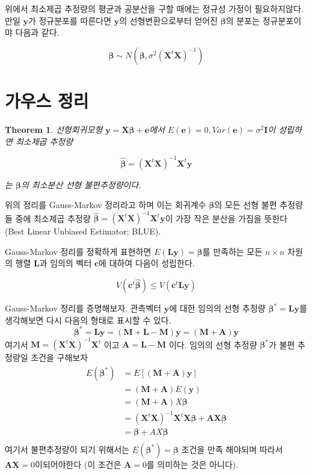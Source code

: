 \documentclass[
]{book}
\newtheorem{theorem}{Theorem}[chapter]
\theoremstyle{definition}
\theoremstyle{definition}
\theoremstyle{definition}
\theoremstyle{remark}
\begin{document}
위에서 최소제곱 추정량의 평균과 공분산을 구할 때에는 정규성 가정이 필요하지않다. 만일 \(\bm y\)가 정규분포를 따른다면 \(\bm y\)의 선형변환으로부터 얻어진 \(\bm \beta\)의 분포는 정규분포이먀 다음과 같다.

\[  \bm \beta \sim N \left (\bm \beta, \sigma^2( \bm X^t \bm X)^{-1} \right ) \]

\hypertarget{uxac00uxc6b0uxc2a4-uxc815uxb9ac}{%
\section{가우스 정리}\label{uxac00uxc6b0uxc2a4-uxc815uxb9ac}}

\begin{theorem}
\protect\hypertarget{thm:unnamed-chunk-13}{}{\label{thm:unnamed-chunk-13} }선형회귀모형 \(\bm y = \bm X \bm \beta + \bm e\)에서 \(E( \bm e)=0, Var( \bm e)=\sigma^2 \bm I\)이 성립하면 최소제곱 추정량

\[ \hat{\bm \beta}=(\bm X^t \bm X)^{-1} \bm X^t \bm y\]

는 \(\bm \beta\)의 최소분산 선형 불편추정량이다.
\end{theorem}

위의 정리를 Gauss-Markov 정리라고 하며 이는 회귀계수 \(\bm \beta\)의 모든 선형 불편 추정량들 중에 최소제곱 추정량 \(\hat {\bm \beta}=(\bm X^t \bm X)^{-1} \bm X^t \bm y\)이 가장 작은 분산을 가짐을 뜻한다 (Best Linear Unbiased Estimator; BLUE).

Gauss-Markov 정리를 정확하게 표현하면 \(E(\bm L \bm y) = \bm \beta\)를 만족하는 모든 \(n \times n\) 차원의 행렬 \(\bm L\)과 임의의 벡터 \(\bm c\)에 대하여 다음이 성립한다.

\[ V(\bm c^t \hat {\bm \beta}) \le V(\bm c^t \bm L \bm y)  \]

Gauss-Markov 정리를 증명해보자. 관측벡터 \(\bm y\)에 대한 임의의 선형 추정량 \(\bm \beta^* = \bm L \bm y\)를 생각해보면 다시 다음의 형태로 표시할 수 있다.
\[  \bm \beta^* =  \bm L  \bm y = (\bm M + \bm L -\bm M ) \bm y = ( \bm M +  \bm A)  \bm y \]
여기서 \(\bm M = ( \bm X^t \bm X)^{-1} \bm X^t\) 이고 \(\bm A= \bm L- \bm M\) 이다.
임의의 선형 추정량 \(\bm \beta^*\)가 불편 추정량일 조건을 구해보자
\begin{align*}
 E( \bm \beta^*) & = E[( \bm M+ \bm A) \bm y] \\
            & = ( \bm M+ \bm A)E( \bm y) \\
            & = ( \bm M+ \bm A)X \bm \beta \\
            & = ( \bm X^t  \bm X)^{-1} \bm X^t  \bm X  \bm \beta +  \bm A  \bm X  \bm \beta \\
            & =  \bm \beta+AX \bm \beta\\
\end{align*}
여기서 불편추정량이 되기 위해서는 \(E( \bm \beta^*)= \bm \beta\) 조건을 만족 해야되며 따라서 \(\bm A \bm X=0\)이되어야한다 (이 조건은 \(\bm A=0\)를 의미하는 것은 아니다).
\end{document}
